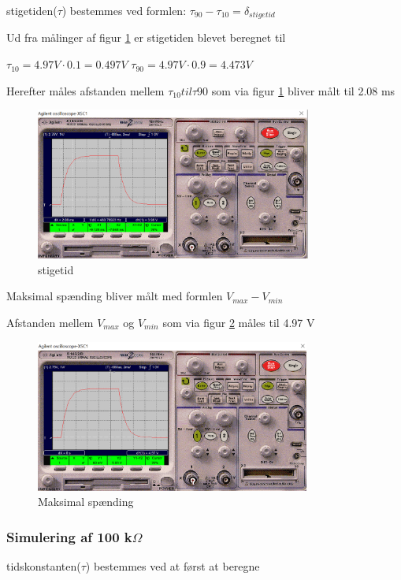 stigetiden($\tau$) bestemmes ved formlen:
$\tau_{90} - \tau_{10} = \delta_{stigetid}$

Ud fra målinger af figur \ref{10k.50Hz.stigetid}
er stigetiden blevet beregnet til

$\tau_{10} = 4.97 V \cdot 0.1 = 0.497 V$
$\tau_{90} = 4.97 V \cdot 0.9 = 4.473 V$

Herefter måles afstanden mellem $\tau_{10} til \tau{90}$ som via figur \ref{10k.50Hz.stigetid} bliver målt til 2.08 ms

\begin{figure}[h]
 \begin{center}
  \includegraphics[height=5cm]{Billeder/figur4.10k.50Hz.stigetid}
  \caption{stigetid}
  \label{10k.50Hz.stigetid}
 \end{center}
\end{figure}

Maksimal spænding bliver målt med formlen
$V_{max} - V_{min}$

Afstanden mellem $V_{max}$ og $V_{min}$ som via figur \ref{10k.50Hz.min.max} måles til 4.97 V

\begin{figure}[h]
 \begin{center}
  \includegraphics[height=5cm]{Billeder/figur2.10k.50Hz.min.max}
  \caption{Maksimal spænding}
  \label{10k.50Hz.min.max}
 \end{center}
\end{figure}


\subsubsection{Simulering af 100 k$\Omega$ }
tidskonstanten($\tau$) bestemmes ved at først at beregne 

